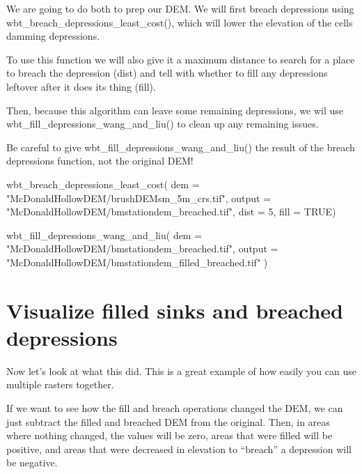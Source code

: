 \documentclass[
]{book}
\newenvironment{Shaded}{\begin{snugshade}}{\end{snugshade}}
\newcommand{\AttributeTok}[1]{\textcolor[rgb]{0.77,0.63,0.00}{#1}}
\newcommand{\ConstantTok}[1]{\textcolor[rgb]{0.00,0.00,0.00}{#1}}
\newcommand{\DecValTok}[1]{\textcolor[rgb]{0.00,0.00,0.81}{#1}}
\newcommand{\FunctionTok}[1]{\textcolor[rgb]{0.00,0.00,0.00}{#1}}
\newcommand{\NormalTok}[1]{#1}
\newcommand{\StringTok}[1]{\textcolor[rgb]{0.31,0.60,0.02}{#1}}
\begin{document}
We are going to do both to prep our DEM. We will first breach depressions using wbt\_breach\_depressions\_least\_cost(), which will lower the elevation of the cells damming depressions.

To use this function we will also give it a maximum distance to search for a place to breach the depression (dist) and tell with whether to fill any depressions leftover after it does its thing (fill).

Then, because this algorithm can leave some remaining depressions, we wil use wbt\_fill\_depressions\_wang\_and\_liu() to clean up any remaining issues.

Be careful to give wbt\_fill\_depressions\_wang\_and\_liu() the result of the breach depressions function, not the original DEM!

\begin{Shaded}
\begin{Highlighting}[]
\FunctionTok{wbt\_breach\_depressions\_least\_cost}\NormalTok{(}
  \AttributeTok{dem =} \StringTok{"McDonaldHollowDEM/brushDEMsm\_5m\_crs.tif"}\NormalTok{,}
  \AttributeTok{output =} \StringTok{"McDonaldHollowDEM/bmstationdem\_breached.tif"}\NormalTok{,}
  \AttributeTok{dist =} \DecValTok{5}\NormalTok{,}
  \AttributeTok{fill =} \ConstantTok{TRUE}\NormalTok{)}

\FunctionTok{wbt\_fill\_depressions\_wang\_and\_liu}\NormalTok{(}
  \AttributeTok{dem =} \StringTok{"McDonaldHollowDEM/bmstationdem\_breached.tif"}\NormalTok{,}
  \AttributeTok{output =} \StringTok{"McDonaldHollowDEM/bmstationdem\_filled\_breached.tif"}
\NormalTok{)}
\end{Highlighting}
\end{Shaded}

\hypertarget{visualize-filled-sinks-and-breached-depressions}{%
\section{Visualize filled sinks and breached depressions}\label{visualize-filled-sinks-and-breached-depressions}}

Now let's look at what this did. This is a great example of how easily you can use multiple rasters together.

If we want to see how the fill and breach operations changed the DEM, we can just subtract the filled and breached DEM from the original. Then, in areas where nothing changed, the values will be zero, areas that were filled will be positive, and areas that were decreased in elevation to ``breach'' a depression will be negative.
\end{document}
